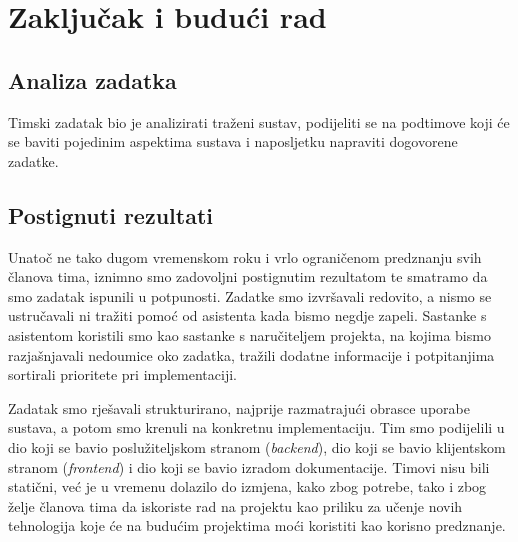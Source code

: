 \chapter{Zaključak i budući rad}
		
		
		
		
		\section{Analiza zadatka}
		\par{
		    Timski zadatak bio je analizirati traženi sustav, podijeliti se na podtimove koji će se baviti pojedinim aspektima sustava i naposljetku napraviti dogovorene zadatke.
		}
		\section{Postignuti rezultati}
		\par{
		    Unatoč ne tako dugom vremenskom roku i vrlo ograničenom predznanju svih članova tima, iznimno smo zadovoljni postignutim rezultatom te smatramo da smo zadatak ispunili u potpunosti. Zadatke smo izvršavali redovito, a nismo se ustručavali ni tražiti pomoć od asistenta kada bismo negdje zapeli. Sastanke s asistentom koristili smo kao sastanke s naručiteljem projekta, na kojima bismo razjašnjavali nedoumice oko zadatka, tražili dodatne informacije i potpitanjima sortirali prioritete pri implementaciji.
		}
		\par{
		    Zadatak smo rješavali strukturirano, najprije razmatrajući obrasce uporabe sustava, a potom smo krenuli na konkretnu implementaciju. Tim smo podijelili u dio koji se bavio poslužiteljskom stranom (\textit{backend}), dio koji se bavio klijentskom stranom (\textit{frontend}) i dio koji se bavio izradom dokumentacije. Timovi nisu bili statični, već je u vremenu dolazilo do izmjena, kako zbog potrebe, tako i zbog želje članova tima da iskoriste rad na projektu kao priliku za učenje novih tehnologija koje će na budućim projektima moći koristiti kao korisno predznanje.
		}
